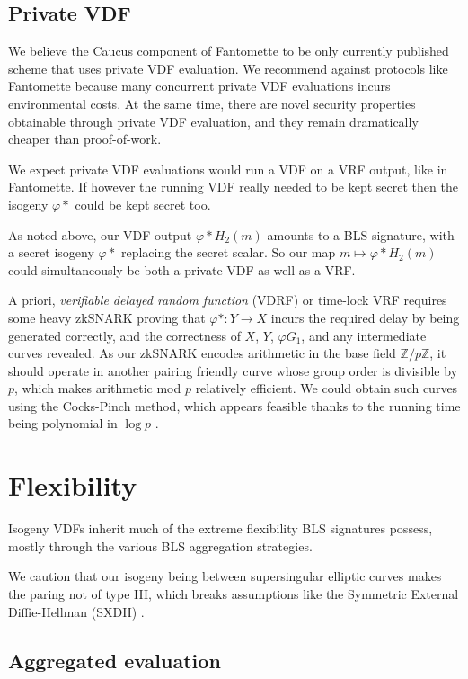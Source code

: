 \documentclass{article}
\newcommand{\Z}{\mathbb{Z}}
\begin{document}
\subsection{Private VDF}

We believe the Caucus component of Fantomette \cite[\S5]{Fantomette}
to be only currently published scheme that uses private VDF evaluation.
We recommend against protocols like Fantomette because many concurrent
private VDF evaluations incurs environmental costs.  At the same time,
there are novel security properties obtainable through private VDF
evaluation, and they remain dramatically cheaper than proof-of-work.

We expect private VDF evaluations would run a VDF on a VRF output,
like in Fantomette.  If however the running VDF really needed to
be kept secret then the isogeny $φ*$ could be kept secret too.

As noted above, our VDF output $φ* H_2(m)$ amounts to a BLS signature,
with a secret isogeny $φ*$ replacing the secret scalar.  So our map
$m \mapsto φ* H_2(m)$ could simultaneously be both a private VDF as
well as a VRF.  

A priori, {\em verifiable delayed random function} (VDRF) or time-lock
VRF requires some heavy zkSNARK proving that $φ* : Y \to X$ incurs the
required delay by being generated correctly, and the correctness of
$X$, $Y$, $φ G_1$, and any intermediate curves revealed.  
As our zkSNARK encodes arithmetic in the base field $\Z/p\Z$,
it should operate in another pairing friendly curve whose group order
is divisible by $p$, which makes arithmetic mod $p$ relatively efficient.
We could obtain such curves using the Cocks-Pinch method, which appears
feasible thanks to the running time being polynomial in $\log p$ \cite{ordinary_cocks_pinch}.


\section{Flexibility}

Isogeny VDFs inherit much of the extreme flexibility BLS signatures
possess, mostly through the various BLS aggregation strategies.

We caution that our isogeny being between supersingular elliptic
curves makes the paring not of type III, which breaks assumptions
like the Symmetric External Diffie-Hellman (SXDH) \cite{ordinary_cocks_pinch}.

\subsection{Aggregated evaluation}
\end{document}
